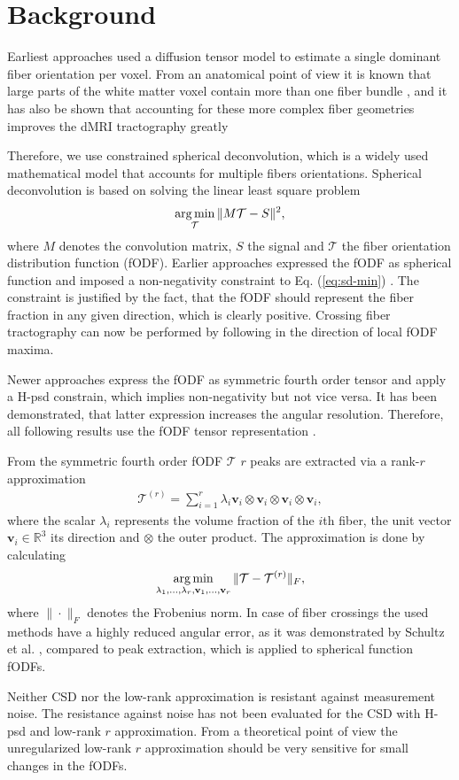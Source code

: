 \section{Background}\label{sec:background}
Earliest approaches used a diffusion tensor model
\cite{LeBihan:1986,Mori:1999} to estimate a single dominant fiber orientation
per voxel. From an anatomical point of view it is known that large parts of the
white matter voxel contain more than one fiber bundle \cite{Jeurissen:2012}, and it has also be shown
that accounting for these more complex fiber geometries improves the dMRI
tractography greatly \cite{Neher:2015}

Therefore, we use constrained spherical deconvolution, which is a widely used
mathematical model that accounts for multiple fibers orientations.
Spherical deconvolution is based on solving the linear least square problem 
\begin{align}
	\operatorname*{arg\,min}_{\mathcal{T}} \| M \mathcal{T} - S \|^2,
	\label{eq:sd-min}
\end{align}
where 
$M$ denotes the convolution matrix, $S$ the signal and $\mathcal{T}$ the fiber
orientation distribution function (fODF).
Earlier approaches expressed the fODF as spherical function and imposed a
non-negativity constraint to Eq. (\ref{eq:sd-min}) \cite{TOURNIER20071459}. The
constraint is justified by
the fact, that the fODF should represent the fiber fraction in any given
direction, which is clearly positive. Crossing fiber tractography can now be
performed by following in the direction of local fODF maxima.

Newer approaches express the fODF as symmetric fourth order tensor and apply a
H-psd constrain, which implies non-negativity but not vice versa. It has been
demonstrated, that latter expression increases the angular resolution.
Therefore, all following results use the fODF tensor representation
\cite{Ankele:CARS2017}. 

From the symmetric fourth order fODF $\mathcal{T}$ $r$ peaks are extracted via a rank-$r$
approximation 
\begin{align}
	\mathcal{T}^{\left( r \right)} = \sum_{i=1}^r \lambda_i \mathbf{v}_i
	\otimes \mathbf{v}_i \otimes \mathbf{v}_i \otimes \mathbf{v}_i, 
	\label{eq:low-rank}
\end{align}
where the scalar $\lambda_i$ represents the volume fraction of the $i$th fiber,
the unit vector $\mathbf{v}_i \in \mathbb{R}^3$ its direction and $\otimes$ the
outer product. The approximation is done by calculating 
\[ \operatorname*{arg\,min}_{\lambda_1, \dots , \lambda_r , \mathbf{v}_1, \dots , \mathbf{v}_r}
\| \mathcal{T} - \mathcal{T}^{\left( r \right)} \|_F, \]
where $\| \cdot \|_F$ denotes the Frobenius norm. In case of fiber crossings the
used methods have a highly reduced angular error, as it was demonstrated by
Schultz et al. \cite{lowrank}, compared to peak extraction, which is applied to spherical function fODFs.

Neither CSD nor the low-rank approximation is resistant against
measurement noise. The resistance against noise has not been evaluated for the
CSD with H-psd and low-rank $r$ approximation. From a theoretical point of view
the unregularized low-rank $r$ approximation should be very sensitive for small
changes in the fODFs.
